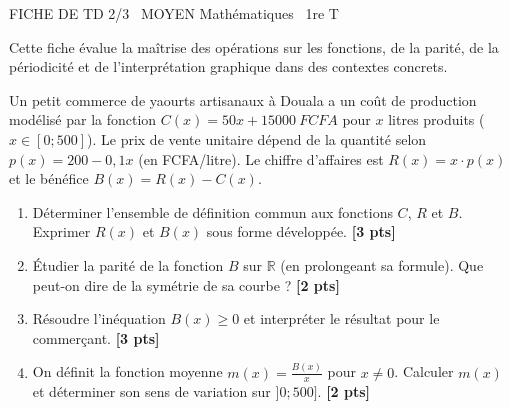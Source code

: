 \documentclass[11pt]{article}
\begin{document}
\begin{tcolorbox}[enhanced,colback=popink,colframe=popink,arc=10pt,boxrule=0pt,left=12pt,right=12pt,top=9pt,bottom=9pt]
{\color{white}\popxbold\small FICHE DE TD 2/3 \textbullet\ MOYEN \hfill Mathématiques \textbullet\ 1re T\par}
\end{tcolorbox}
\vspace{4pt}
Cette fiche évalue la maîtrise des opérations sur les fonctions, de la parité, de la périodicité et de l'interprétation graphique dans des contextes concrets.

\begin{exercice}
Un petit commerce de yaourts artisanaux à Douala a un coût de production modélisé par la fonction $C(x) = 50x + \SI{15000}{FCFA}$ pour $x$ litres produits ($x \in [0; 500]$). Le prix de vente unitaire dépend de la quantité selon $p(x) = 200 - 0{,}1x$ (en FCFA/litre). Le chiffre d'affaires est $R(x) = x \cdot p(x)$ et le bénéfice $B(x) = R(x) - C(x)$.
\begin{enumerate}
    \item Déterminer l'ensemble de définition commun aux fonctions $C$, $R$ et $B$. Exprimer $R(x)$ et $B(x)$ sous forme développée. \hfill\textbf{[3 pts]}
    \item Étudier la parité de la fonction $B$ sur $\mathbb{R}$ (en prolongeant sa formule). Que peut-on dire de la symétrie de sa courbe ? \hfill\textbf{[2 pts]}
    \item Résoudre l'inéquation $B(x) \ge 0$ et interpréter le résultat pour le commerçant. \hfill\textbf{[3 pts]}
    \item On définit la fonction moyenne $m(x) = \frac{B(x)}{x}$ pour $x \neq 0$. Calculer $m(x)$ et déterminer son sens de variation sur $]0; 500]$. \hfill\textbf{[2 pts]}
\end{enumerate}
\end{exercice}
\end{document}
